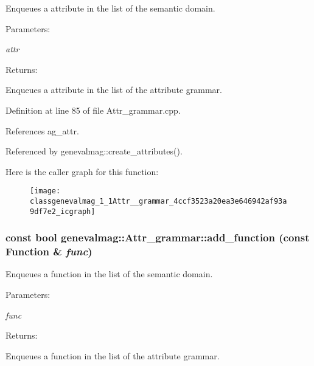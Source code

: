 Enqueues a attribute in the list of the semantic domain. \begin{Desc}
\item[Parameters:]
\begin{description}
\item[{\em attr}]\end{description}
\end{Desc}
\begin{Desc}
\item[Returns:]\end{Desc}
Enqueues a attribute in the list of the attribute grammar. 

Definition at line 85 of file Attr\_\-grammar.cpp.

References ag\_\-attr.

Referenced by genevalmag::create\_\-attributes().

Here is the caller graph for this function:\nopagebreak
\begin{figure}[H]
\begin{center}
\leavevmode
\texttt{[image: classgenevalmag\_1\_1Attr\_\_grammar\_4ccf3523a20ea3e646942af93a9df7e2\_icgraph]}
\end{center}
\end{figure}
\hypertarget{classgenevalmag_1_1Attr__grammar_2dc3357532cdef0dd92eaf3f55ca2ec2}{
\subsubsection[{add\_\-function}]{\setlength{\rightskip}{0pt plus 5cm}const bool genevalmag::Attr\_\-grammar::add\_\-function (const {\bf Function} \& {\em func})}}
\label{classgenevalmag_1_1Attr__grammar_2dc3357532cdef0dd92eaf3f55ca2ec2}


Enqueues a function in the list of the semantic domain. \begin{Desc}
\item[Parameters:]
\begin{description}
\item[{\em func}]\end{description}
\end{Desc}
\begin{Desc}
\item[Returns:]\end{Desc}
Enqueues a function in the list of the attribute grammar. 

